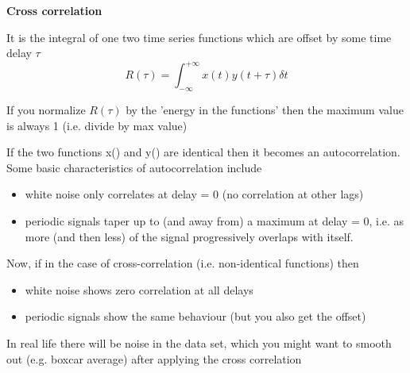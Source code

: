 \documentclass[10pt,a4paper]
{article}
\begin{document}
\raggedright


\textbf{Cross correlation}

It is the integral of one two time series functions which are offset by some time delay $\tau$
$$R(\tau)= \int_{-\infty}^{+\infty}x(t)y(t+\tau)\delta t $$

If you normalize $R(\tau)$ by the 'energy in the functions' then the maximum value is always 1 (i.e. divide by max value)\par

If the two functions x() and y() are identical then it becomes an autocorrelation. Some basic characteristics of autocorrelation include

\begin{itemize}
  \item white noise only correlates at delay = 0 (no correlation at other lags)
  \item periodic signals taper up to (and away from) a maximum at delay = 0, i.e. as more (and then less) of the signal progressively overlaps with itself.
\end{itemize}

Now, if in the case of cross-correlation (i.e. non-identical functions) then

\begin{itemize}
  \item white noise shows zero correlation at all delays
  \item periodic signals show the same behaviour (but you also get the offset)
\end{itemize}

In real life there will be noise in the data set, which you might want to smooth out (e.g. boxcar average) after applying the cross correlation
\end{document}
